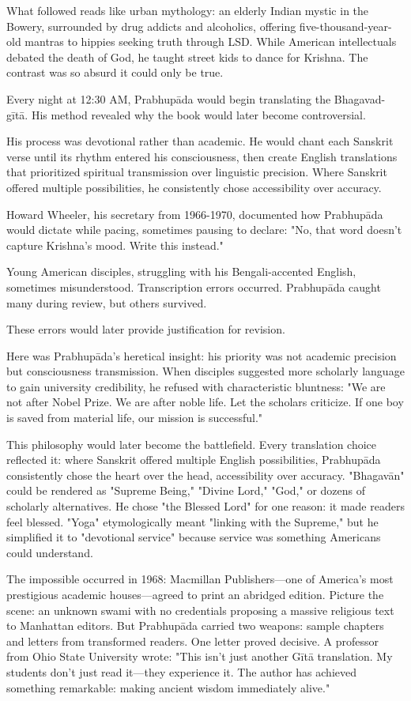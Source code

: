 \documentclass[11pt,twoside]{book}
\begin{document}
What followed reads like urban mythology: an elderly Indian mystic in the Bowery, surrounded by drug addicts and alcoholics, offering five-thousand-year-old mantras to hippies seeking truth through LSD. While American intellectuals debated the death of God, he taught street kids to dance for Krishna. The contrast was so absurd it could only be true.

Every night at 12:30 AM, Prabhupāda would begin translating the Bhagavad-gītā. His method revealed why the book would later become controversial.

His process was devotional rather than academic. He would chant each Sanskrit verse until its rhythm entered his consciousness, then create English translations that prioritized spiritual transmission over linguistic precision. Where Sanskrit offered multiple possibilities, he consistently chose accessibility over accuracy.

Howard Wheeler, his secretary from 1966-1970, documented how Prabhupāda would dictate while pacing, sometimes pausing to declare: "No, that word doesn't capture Krishna's mood. Write this instead."

Young American disciples, struggling with his Bengali-accented English, sometimes misunderstood. Transcription errors occurred. Prabhupāda caught many during review, but others survived.

These errors would later provide justification for revision.

Here was Prabhupāda's heretical insight: his priority was not academic precision but consciousness transmission. When disciples suggested more scholarly language to gain university credibility, he refused with characteristic bluntness: "We are not after Nobel Prize. We are after noble life. Let the scholars criticize. If one boy is saved from material life, our mission is successful."

This philosophy would later become the battlefield. Every translation choice reflected it: where Sanskrit offered multiple English possibilities, Prabhupāda consistently chose the heart over the head, accessibility over accuracy. "Bhagavān" could be rendered as "Supreme Being," "Divine Lord," "God," or dozens of scholarly alternatives. He chose "the Blessed Lord" for one reason: it made readers feel blessed. "Yoga" etymologically meant "linking with the Supreme," but he simplified it to "devotional service" because service was something Americans could understand.

The impossible occurred in 1968: Macmillan Publishers—one of America's most prestigious academic houses—agreed to print an abridged edition. Picture the scene: an unknown swami with no credentials proposing a massive religious text to Manhattan editors. But Prabhupāda carried two weapons: sample chapters and letters from transformed readers. One letter proved decisive. A professor from Ohio State University wrote: "This isn't just another Gītā translation. My students don't just read it—they experience it. The author has achieved something remarkable: making ancient wisdom immediately alive."
\end{document}
